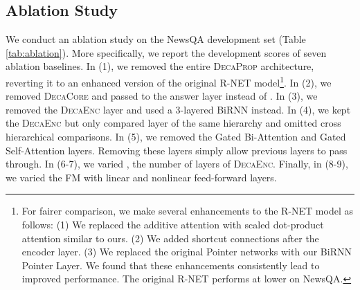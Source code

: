 \documentclass{article}
\begin{document}
\subsection{Ablation Study}
We conduct an ablation study on the NewsQA development set (Table \ref{tab:ablation}). More specifically, we report the development scores of seven ablation baselines. In (1), we removed the entire \textsc{DecaProp} architecture, reverting it to an enhanced version of the original R-NET model\footnote{For fairer comparison, we make several enhancements to the R-NET model as follows: (1) We replaced the additive attention with scaled dot-product attention similar to ours. (2) We added shortcut connections after the encoder layer. (3) We replaced the original Pointer networks with our BiRNN Pointer Layer. We found that these enhancements consistently lead to improved performance. The original R-NET performs at  lower on NewsQA.}. In (2), we removed \textsc{DecaCore} and passed  to the answer layer instead of . In (3), we removed the \textsc{DecaEnc} layer and used a 3-layered BiRNN instead. In (4), we kept the \textsc{DecaEnc} but only compared layer of the same hierarchy and omitted cross hierarchical comparisons. In (5), we removed the Gated Bi-Attention and Gated Self-Attention layers. Removing these layers simply allow previous layers to pass through. In (6-7), we varied , the number of layers of \textsc{DecaEnc}. Finally, in (8-9), we varied the FM with linear and nonlinear feed-forward layers.
\end{document}
